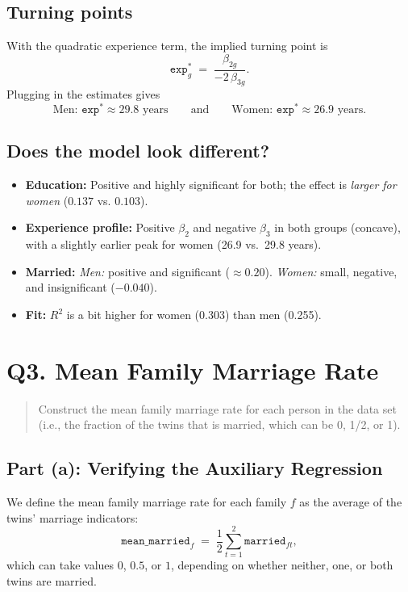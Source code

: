 \documentclass[12pt]{article}
\begin{document}
\subsection*{Turning points}
With the quadratic experience term, the implied turning point is
\[
  \texttt{exp}^{*}_g \;=\; \frac{\beta_{2g}}{-2\,\beta_{3g}}.
\]
Plugging in the estimates gives
\[
  \text{Men: } \texttt{exp}^{*}\approx 29.8 \text{ years}
  \qquad\text{and}\qquad
  \text{Women: } \texttt{exp}^{*}\approx 26.9 \text{ years}.
\]

\subsection*{Does the model look different?}
\begin{itemize}[leftmargin=1.25em]
  \item \textbf{Education:} Positive and highly significant for both; the effect is \emph{larger for women} (\(0.137\) vs. \(0.103\)).
  \item \textbf{Experience profile:} Positive \(\beta_2\) and negative \(\beta_3\) in both groups (concave), with a slightly earlier peak for women (26.9 vs.\ 29.8 years).
  \item \textbf{Married:} \emph{Men:} positive and significant (\(\approx 0.20\)). \emph{Women:} small, negative, and insignificant (\(-0.040\)).
  \item \textbf{Fit:} \(R^2\) is a bit higher for women (0.303) than men (0.255).
\end{itemize}

\section*{Q3. Mean Family Marriage Rate}

\begin{quote}
Construct the mean family marriage rate for each person in the data set (i.e., the fraction of the twins that is married, which can be 0, 1/2, or 1).
\end{quote}

\subsection*{Part (a): Verifying the Auxiliary Regression}

We define the mean family marriage rate for each family \(f\) as the average of the twins’ marriage indicators:
\[
  \texttt{mean\_married}_f \;=\; \frac{1}{2}\sum_{t=1}^{2}\texttt{married}_{ft},
\]
which can take values \(0\), \(0.5\), or \(1\), depending on whether neither, one, or both twins are married.
\end{document}
